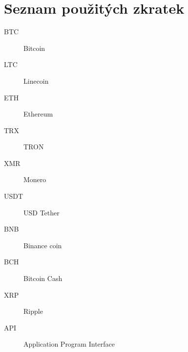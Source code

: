 \documentclass[thesis=B,czech]{FITthesis}[2019/03/21]
\begin{document}
\chapter{Seznam použitých zkratek}
\begin{description}
	\item[BTC] Bitcoin
	\item[LTC] Linecoin
	\item[ETH] Ethereum
	\item[TRX] TRON
	\item[XMR] Monero
	\item[USDT] USD Tether
	\item[BNB] Binance coin
	\item[BCH] Bitcoin Cash
	\item[XRP] Ripple
	\item[API] Application Program Interface
\end{description}
\end{document}
